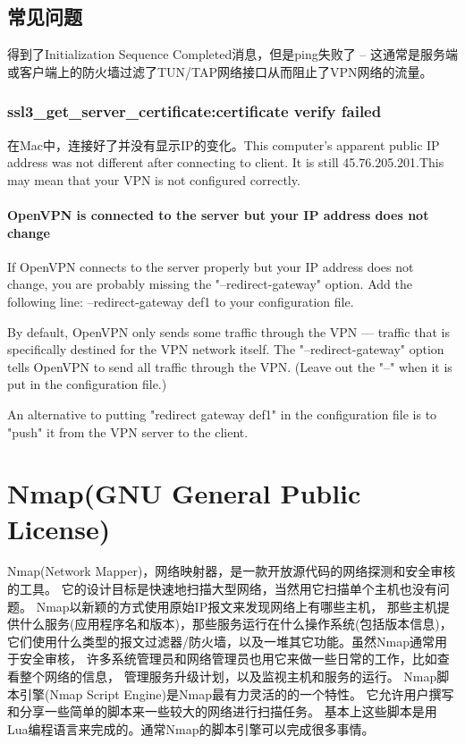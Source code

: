 \documentclass[letter]{book}
\begin{document}
\subsection{常见问题}

得到了Initialization Sequence Completed消息，但是ping失败了 -- 这通常是服务端或客户端上的防火墙过滤了TUN/TAP网络接口从而阻止了VPN网络的流量。  

\subsubsection{ssl3\_get\_server\_certificate:certificate verify failed}

在Mac中，连接好了并没有显示IP的变化。This computer's apparent public IP address was not different after connecting to client. It is still 45.76.205.201.This may mean that your VPN is not configured correctly.


\paragraph{OpenVPN is connected to the server but your IP address does not change}

If OpenVPN connects to the server properly but your IP address does not change, you are probably missing the "--redirect-gateway" option. Add the following line:
--redirect-gateway def1 to your configuration file.

By default, OpenVPN only sends some traffic through the VPN — traffic that is specifically destined for the VPN network itself. The "--redirect-gateway" option tells OpenVPN to send all traffic through the VPN. (Leave out the "--" when it is put in the configuration file.)

An alternative to putting "redirect gateway def1" in the configuration file is to "push" it from the VPN server to the client.

\section{Nmap(GNU General Public License)}

Nmap(Network Mapper)，网络映射器，是一款开放源代码的网络探测和安全审核的工具。
它的设计目标是快速地扫描大型网络，当然用它扫描单个主机也没有问题。
Nmap以新颖的方式使用原始IP报文来发现网络上有哪些主机，
那些主机提供什么服务(应用程序名和版本)，那些服务运行在什么操作系统(包括版本信息)，
它们使用什么类型的报文过滤器/防火墙，以及一堆其它功能。虽然Nmap通常用于安全审核，
许多系统管理员和网络管理员也用它来做一些日常的工作，比如查看整个网络的信息，
管理服务升级计划，以及监视主机和服务的运行。
Nmap脚本引擎(Nmap Script Engine)是Nmap最有力灵活的的一个特性。
它允许用户撰写和分享一些简单的脚本来一些较大的网络进行扫描任务。
基本上这些脚本是用Lua编程语言来完成的。通常Nmap的脚本引擎可以完成很多事情。
\end{document}
